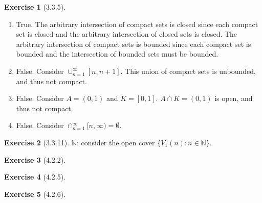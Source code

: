 \documentclass{amsart}
\theoremstyle{definition}
\newtheorem{exercise}{Exercise}
\newcommand{\N}{\mathbb{N}}
\newcommand{\st}{\mathrel{:}}
\begin{document}
\begin{exercise}[3.3.5]
  \begin{enumerate}[label={(\alph*)}]
    \item True. The arbitrary intersection of compact sets is closed since each
      compact set is closed and the arbitrary intersection of closed sets is
      closed. The arbitrary intersection of compact sets is bounded since each
      compact set is bounded and the intersection of bounded sets must be
      bounded.
    \item False. Consider $\cup_{n=1}^\infty [n, n+1]$. This union of compact
      sets is unbounded, and thus not compact.
    \item False. Consider $A = (0, 1)$ and $K = [0, 1]$. $A \cap K = (0, 1)$ is
      open, and thus not compact.
    \item False. Consider $\cap_{n=1}^\infty \lbrack n, \infty \rparen =
      \emptyset$.
  \end{enumerate}
\end{exercise}

\begin{exercise}[3.3.11]
  $\N$: consider the open cover $\{V_1(n) \st n \in \N\}$.
\end{exercise}

\begin{exercise}[4.2.2]
\end{exercise}

\begin{exercise}[4.2.5]
\end{exercise}

\begin{exercise}[4.2.6]
\end{exercise}
\end{document}
